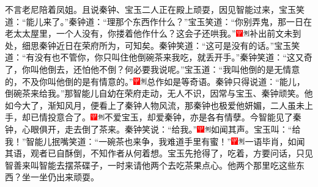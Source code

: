 不言老尼陪着凤姐。且说秦钟、宝玉二人正在殿上顽耍，因见智能过来，宝玉笑道：``能儿来了。''秦钟道：``理那个东西作什么？''宝玉笑道：``你别弄鬼，那一日在老太太屋里，一个人没有，你搂着他作什么？这会子还哄我。''{\includegraphics[width=3mm]{../Images/00002}\includegraphics[width=3mm]{../Images/00011}\footnotesize \kaishu 补出前文未到处，细思秦钟近日在荣府所为，可知矣。}秦钟笑道：``这可是没有的话。''宝玉笑道：``有没有也不管你，你只叫住他倒碗茶来我吃，就丢开手。''秦钟笑道：``这又奇了，你叫他倒去，还怕他不倒？何必要我说呢。''宝玉道：``我叫他倒的是无情意的，不及你叫他倒的是有情意的。''{\includegraphics[width=3mm]{../Images/00002}\includegraphics[width=3mm]{../Images/00011}\footnotesize \kaishu 总作如是等奇语。}秦钟只得说道：``能儿，倒碗茶来给我。''那智能儿自幼在荣府走动，无人不识，因常与宝玉、秦钟顽笑。他如今大了，渐知风月，便看上了秦钟人物风流，那秦钟也极爱他妍媚，二人虽未上手，却已情投意合了。{\includegraphics[width=3mm]{../Images/00002}\includegraphics[width=3mm]{../Images/00011}\footnotesize \kaishu 不爱宝玉，却爱秦钟，亦是各有情孽。}今智能见了秦钟，心眼俱开，走去倒了茶来。秦钟笑说：``给我。''{\includegraphics[width=3mm]{../Images/00002}\includegraphics[width=3mm]{../Images/00011}\footnotesize \kaishu 如闻其声。}宝玉叫：``给我！''智能儿抿嘴笑道：``一碗茶也来争，我难道手里有蜜！''{\includegraphics[width=3mm]{../Images/00002}\includegraphics[width=3mm]{../Images/00011}\footnotesize \kaishu 一语毕肖，如闻其语，观者已自酥倒，不知作者从何着想。}宝玉先抢得了，吃着，方要问话，只见智善来叫智能去摆茶碟子，一时来请他两个去吃茶果点心。他两个那里吃这些东西？坐一坐仍出来顽耍。

